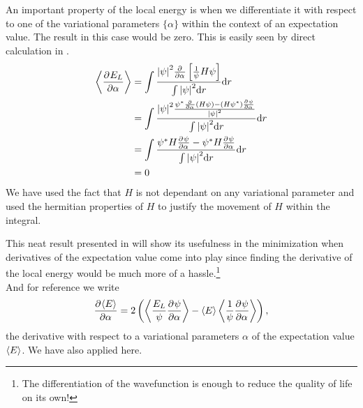         An important property of the local energy is when we differentiate it
        with respect to one of the variational parameters $\{\alpha\}$ within
        the context of an expectation value. The result in this case would be
        zero. This is easily seen by direct calculation in
        .
            \begin{align}
                \ecp{\prd{\alpha}[E_L]} &= \int \frac{\abs{\psi}^2\prd{\alpha}
                \left[\frac{1}{\psi}H\psi\right]}{\int \abs{\psi}^2 \md r} \md
                r \nonumber \\
                &= \int \frac{\abs{\psi}^2 \frac{\psi^{*}\prd{\alpha}(H\psi) -
                (H\psi^{*}) \prd{\alpha}[\psi]}{\abs{\psi}^2}}{\int
                \abs{\psi}^2 \md r} \md r \nonumber \\
                &= \int \frac{\psi^{*}H\prd{\alpha}[\psi] -
                \psi^{*}H\prd{\alpha}[\psi]}{\int \abs{\psi}^2 \md r} \md r
                \nonumber \\
                &= 0
                \label{eq:expELdelzero}
            \end{align}
        We have used the fact that $H$ is not dependant on any variational
        parameter and used the hermitian properties\cite{GriffQuan} of $H$ to
        justify the movement of $H$ within the integral.  

        This neat result presented in  will show its
        usefulness in the minimization when derivatives of the expectation
        value come into play since finding the derivative of the local energy
        would be much more of a hassle.\footnote{The differentiation of the
        wavefunction is enough to reduce the quality of life on its own!} \\
        And for reference we write
            \begin{equation}
               \prd{\alpha}[\ecp{E}] =
                2\left(\ecp{\frac{E_L}{\psi}\prd{\alpha}[\psi]} -
                \ecp{E}\ecp{\frac{1}{\psi}\prd{\alpha}[\psi]}\right),
            \end{equation}
        the derivative with respect to a variational parameters $\alpha$ of the
        expectation value $\left< {E} \right>$. We have also applied 
        here.

